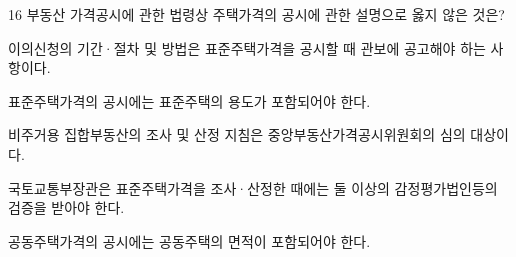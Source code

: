 \begin{question}{16}
부동산 가격공시에 관한 법령상 주택가격의 공시에 관한 설명으로 옳지 않은 것은?
\begin{choices}
  \item 이의신청의 기간·절차 및 방법은 표준주택가격을 공시할 때 관보에 공고해야 하는 사항이다.
  \item 표준주택가격의 공시에는 표준주택의 용도가 포함되어야 한다.
  \item 비주거용 집합부동산의 조사 및 산정 지침은 중앙부동산가격공시위원회의 심의 대상이다.
  \item 국토교통부장관은 표준주택가격을 조사·산정한 때에는 둘 이상의 감정평가법인등의 검증을 받아야 한다.
  \item 공동주택가격의 공시에는 공동주택의 면적이 포함되어야 한다.
\end{choices}
\end{question}

